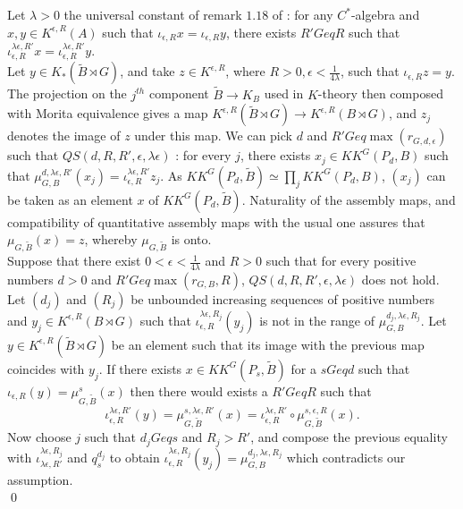\begin{dem}
Let $\lambda>0$ the universal constant of remark $1.18$ of \cite{OY2} : for any $C^*$-algebra and $x,y\in K^{\epsilon, R}(A)$ such that $\iota_{\epsilon,R} x =\iota_{\epsilon,R}y$, there exists $R'Geq R$ such that $\iota_{\epsilon,R}^{\lambda\epsilon,R'} x =\iota_{\epsilon,R}^{\lambda\epsilon,R'}y$.\\

Let $y\in K_*(\tilde B\rtimes G)$, and take $z\in K^{\epsilon,R}$, where $R>0,\epsilon<\frac{1}{4\lambda}$, such that $\iota_{\epsilon,R}z = y$. The projection on the $j^{th}$ component $\tilde B \rightarrow K_B $ used in $K$-theory then composed with Morita equivalence gives a map $K^{\epsilon,R}(\tilde B\rtimes G)\rightarrow K^{\epsilon ,R}(B\rtimes G)$, and $z_j$ denotes the image of $z$ under this map. We can pick $d$ and $R'Geq\max (r_{G,d,\epsilon})$ such that $QS(d,R,R',\epsilon,\lambda\epsilon)$ : for every $j$, there exists $x_j\in KK^G(P_d,B) $ such that $\mu_{G,B}^{d,\lambda\epsilon,R'}(x_j)=\iota_{\epsilon,R}^{\lambda\epsilon,R'}z_j$. As $KK^G(P_d,\tilde B)\simeq \prod_j KK^G(P_d,B)$, $(x_j)$ can be taken as an element $x$ of $KK^G(P_d,\tilde B)$. Naturality of the assembly maps, and compatibility of quantitative assembly maps with the usual one assures that $\mu_{G,\tilde B}(x)=z$, whereby $\mu_{G,\tilde B}$ is onto.\\

Suppose that there exist $0<\epsilon<\frac{1}{4\lambda}$ and $R>0$ such that for every positive numbers $d>0$ and $R'Geq\max (r_{G,B},R)$, $QS(d,R,R',\epsilon,\lambda\epsilon)$ does not hold. Let $(d_j)$ and $(R_j)$ be unbounded increasing sequences of positive numbers and $y_j\in K^{\epsilon,R}(B\rtimes G)$ such that $\iota_{\epsilon,R}^{\lambda\epsilon,R_j}(y_j)$ is not in the range of $\mu_{G,B}^{d_j,\lambda\epsilon,R_j}$. Let $y\in K^{\epsilon,R}(\tilde B\rtimes G)$ be an element such that its image with the previous map coincides with $y_j$. If there exists $x\in KK^G(P_{s},\tilde B)$ for a $sGeq d$ such that $\iota_{\epsilon,R}( y) =\mu_{G,\tilde B}^s(x)$ then there would exists a $R'Geq R$ such that
\[\iota_{\epsilon,R}^{\lambda\epsilon, R'}( y) =\mu_{G,\tilde B}^{s,\lambda\epsilon,R'}(x) = \iota_{\epsilon,R}^{\lambda\epsilon, R'}\circ\mu_{G,\tilde B}^{s,\epsilon,R}(x).\]
Now choose $j$ such that $d_jGeq s$ and $R_j>R'$, and compose the previous equality with $\iota_{\lambda\epsilon,R'}^{\lambda\epsilon,R_j}$ and $q_s^{d_j}$ to obtain $\iota_{\epsilon,R}^{\lambda\epsilon,R_j}(y_j)=\mu_{G,B}^{d_j,\lambda\epsilon,R_j}$ which contradicts our assumption.\\
\qed
\end{dem}

